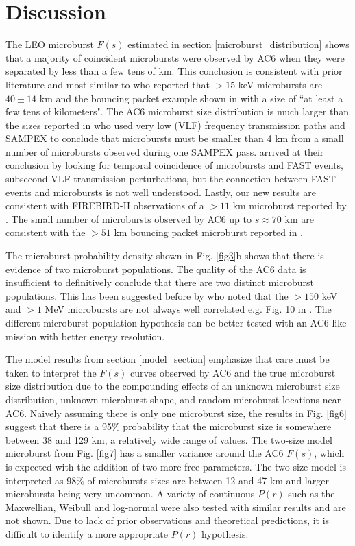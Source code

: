 \documentclass[draft]{agujournal2019}
\begin{document}
\section{Discussion}
The LEO microburst $F(s)$ estimated in section \ref{microburst_distribution} shows that a majority of coincident microbursts were observed by AC6 when they were separated by less than a few tens of km. This conclusion is consistent with prior literature and most similar to  who reported that $> 15$ keV microbursts are $40 \pm 14$ km and the bouncing packet example shown in  with a size of ``at least a few tens of kilometers". The AC6 microburst size distribution is much larger than the sizes reported in  who used very low (VLF) frequency transmission paths and SAMPEX to conclude that microbursts must be smaller than 4 km from a small number of microbursts observed during one SAMPEX pass.  arrived at their conclusion by looking for temporal coincidence of microbursts and FAST events, subsecond VLF transmission perturbations, but the connection between FAST events and microbursts is not well understood. Lastly, our new results are consistent with FIREBIRD-II observations of a $> 11$ km microburst reported by . The small number of microbursts observed by AC6 up to $s \approx 70$ km are consistent with the $> 51$ km bouncing packet microburst reported in . 

The microburst probability density shown in Fig. \ref{fig3}b shows that there is evidence of two microburst populations. The quality of the AC6 data is insufficient to definitively conclude that there are two distinct microburst populations. This has been suggested before by  who noted that the $> 150$ keV and $> 1$ MeV microbursts are not always well correlated e.g. Fig. 10 in . The different microburst population hypothesis can be better tested with an AC6-like mission with better energy resolution.

The model results from section \ref{model_section} emphasize that care must be taken to interpret the $F(s)$ curves observed by AC6 and the true microburst size distribution due to the compounding effects of an unknown microburst size distribution, unknown microburst shape, and random microburst locations near AC6. Naively assuming there is only one microburst size, the results in Fig. \ref{fig6} suggest that there is a 95\% probability that the microburst size is somewhere between 38 and 129 km, a relatively wide range of values. The two-size model microburst from Fig. \ref{fig7} has a smaller variance around the AC6 $F(s)$, which is expected with the addition of two more free parameters. The two size model is interpreted as 98\% of microbursts sizes are between 12 and 47 km and larger microbursts being very uncommon. A variety of continuous $P(r)$ such as the Maxwellian, Weibull and log-normal were also tested with similar results and are not shown. Due to lack of prior observations and theoretical predictions, it is difficult to identify a more appropriate $P(r)$ hypothesis.
\end{document}
